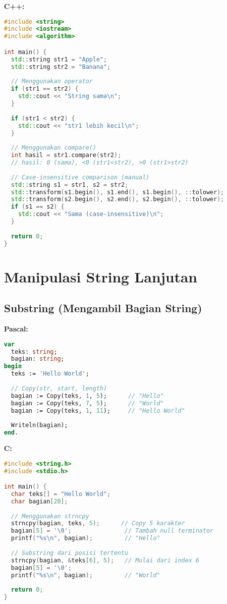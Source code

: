 \documentclass[../main.tex]{subfiles}
\begin{document}
\textbf{C++:}
\begin{lstlisting}[language=C++, caption={Perbandingan di C++}]
#include <string>
#include <iostream>
#include <algorithm>

int main() {
  std::string str1 = "Apple";
  std::string str2 = "Banana";
  
  // Menggunakan operator
  if (str1 == str2) {
    std::cout << "String sama\n";
  }
  
  if (str1 < str2) {
    std::cout << "str1 lebih kecil\n";
  }
  
  // Menggunakan compare()
  int hasil = str1.compare(str2);
  // hasil: 0 (sama), <0 (str1<str2), >0 (str1>str2)
  
  // Case-insensitive comparison (manual)
  std::string s1 = str1, s2 = str2;
  std::transform(s1.begin(), s1.end(), s1.begin(), ::tolower);
  std::transform(s2.begin(), s2.end(), s2.begin(), ::tolower);
  if (s1 == s2) {
    std::cout << "Sama (case-insensitive)\n";
  }
  
  return 0;
}
\end{lstlisting}

\section{Manipulasi String Lanjutan}

\subsection{Substring (Mengambil Bagian String)}

\textbf{Pascal:}
\begin{lstlisting}[language=Pascal, caption={Substring di Pascal}]
var
  teks: string;
  bagian: string;
begin
  teks := 'Hello World';
  
  // Copy(str, start, length)
  bagian := Copy(teks, 1, 5);      // "Hello"
  bagian := Copy(teks, 7, 5);      // "World"
  bagian := Copy(teks, 1, 11);     // "Hello World"
  
  Writeln(bagian);
end.
\end{lstlisting}

\textbf{C:}
\begin{lstlisting}[language=C, caption={Substring di C}]
#include <string.h>
#include <stdio.h>

int main() {
  char teks[] = "Hello World";
  char bagian[20];
  
  // Menggunakan strncpy
  strncpy(bagian, teks, 5);      // Copy 5 karakter
  bagian[5] = '\0';               // Tambah null terminator
  printf("%s\n", bagian);         // "Hello"
  
  // Substring dari posisi tertentu
  strncpy(bagian, &teks[6], 5);   // Mulai dari index 6
  bagian[5] = '\0';
  printf("%s\n", bagian);         // "World"
  
  return 0;
}
\end{lstlisting}
\end{document}
